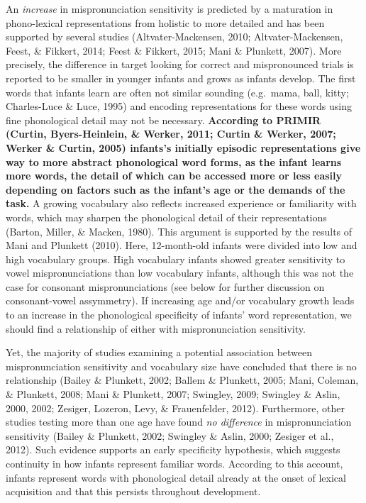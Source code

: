 \documentclass[man]{apa6}
\begin{document}
An \emph{increase} in mispronunciation sensitivity is predicted by a maturation in phono-lexical representations from holistic to more detailed and has been supported by several studies (Altvater-Mackensen, 2010; Altvater-Mackensen, Feest, \& Fikkert, 2014; Feest \& Fikkert, 2015; Mani \& Plunkett, 2007). More precisely, the difference in target looking for correct and mispronounced trials is reported to be smaller in younger infants and grows as infants develop. The first words that infants learn are often not similar sounding (e.g.~mama, ball, kitty; Charles-Luce \& Luce, 1995) and encoding representations for these words using fine phonological detail may not be necessary. \textbf{According to PRIMIR (Curtin, Byers-Heinlein, \& Werker, 2011; Curtin \& Werker, 2007; Werker \& Curtin, 2005) infants's initially episodic representations give way to more abstract phonological word forms, as the infant learns more words, the detail of which can be accessed more or less easily depending on factors such as the infant's age or the demands of the task.} A growing vocabulary also reflects increased experience or familiarity with words, which may sharpen the phonological detail of their representations (Barton, Miller, \& Macken, 1980). This argument is supported by the results of Mani and Plunkett (2010). Here, 12-month-old infants were divided into low and high vocabulary groups. High vocabulary infants showed greater sensitivity to vowel mispronunciations than low vocabulary infants, although this was not the case for consonant mispronunciations (see below for further discussion on consonant-vowel assymmetry). If increasing age and/or vocabulary growth leads to an increase in the phonological specificity of infants' word representation, we should find a relationship of either with mispronunciation sensitivity.

Yet, the majority of studies examining a potential association between mispronunciation sensitivity and vocabulary size have concluded that there is no relationship (Bailey \& Plunkett, 2002; Ballem \& Plunkett, 2005; Mani, Coleman, \& Plunkett, 2008; Mani \& Plunkett, 2007; Swingley, 2009; Swingley \& Aslin, 2000, 2002; Zesiger, Lozeron, Levy, \& Frauenfelder, 2012). Furthermore, other studies testing more than one age have found \emph{no difference} in mispronunciation sensitivity (Bailey \& Plunkett, 2002; Swingley \& Aslin, 2000; Zesiger et al., 2012). Such evidence supports an early specificity hypothesis, which suggests continuity in how infants represent familiar words. According to this account, infants represent words with phonological detail already at the onset of lexical acquisition and that this persists throughout development.
\end{document}
